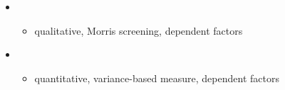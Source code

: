 \begin{frame}[allowframebreaks]

\begin{itemize}\small\setlength\itemsep{1em}
\item {}\\
\begin{itemize}\footnotesize
	\item \footnotesize qualitative, Morris screening, dependent factors
\end{itemize}
\item {}\\
\begin{itemize}\footnotesize
	\item quantitative, variance-based measure, dependent factors
\end{itemize}
\end{itemize}

\end{frame}
